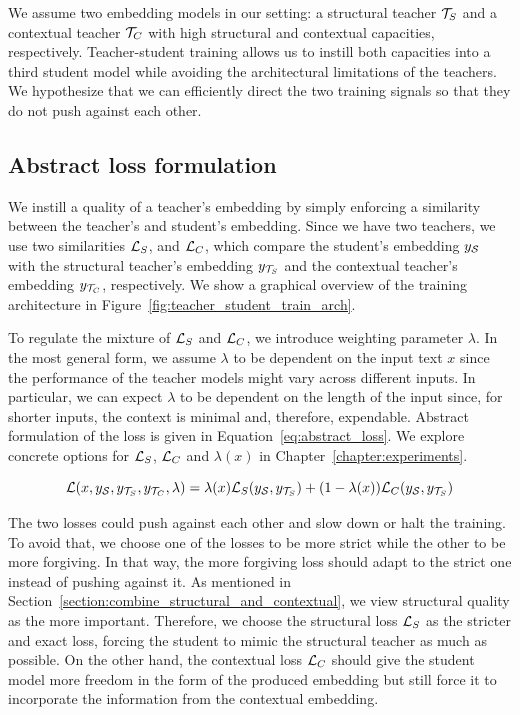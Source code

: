 We assume two embedding models in our setting: a structural teacher
$\mathcal{T}_S$ and a contextual teacher $\mathcal{T}_C$ with high structural and
contextual capacities, respectively. Teacher-student training allows us to
instill both capacities into a third student model {\Student} while avoiding
the architectural limitations of the teachers. We hypothesize that we can
efficiently direct the two training signals so that they do not push against
each other.


\subsection{Abstract loss formulation}\label{section:abstract_loss}


We instill a quality of a teacher's embedding by simply enforcing a similarity
between the teacher's and student's embedding. Since we have two teachers, we
use two similarities $\mathcal{L}_S$, and $\mathcal{L}_C$, which compare the student's
embedding $y_{\mathcal{S}}$ with the structural teacher's embedding $y_{\mathcal{T}_S}$
and the contextual teacher's embedding $y_{\mathcal{T}_C}$, respectively. We show
a graphical overview of the training architecture in
Figure~\ref{fig:teacher_student_train_arch}.

To regulate the mixture of $\mathcal{L}_S$ and $\mathcal{L}_C$, we introduce weighting
parameter $\lambda$. In the most general form, we assume $\lambda$ to be
dependent on the input text $x$ since the performance of the teacher models
might vary across different inputs. In particular, we can expect $\lambda$ to
be dependent on the length of the input since, for shorter inputs, the context
is minimal and, therefore, expendable. Abstract formulation of the loss is
given in Equation~\ref{eq:abstract_loss}. We explore concrete options for
$\mathcal{L}_S$, $\mathcal{L}_C$ and $\lambda(x)$ in Chapter~\ref{chapter:experiments}.

\begin{equation}\label{eq:abstract_loss}
  \mathcal{L}(
    x,
    y_{\mathcal{S}},
    y_{\mathcal{T}_S},
    y_{\mathcal{T}_C},
    \lambda
  ) =
    \lambda(x) \mathcal{L}_S(y_{\mathcal{S}}, y_{\mathcal{T}_S}) +
            (1 - \lambda(x)) \mathcal{L}_C(y_{\mathcal{S}}, y_{\mathcal{T}_S})
\end{equation}

The two losses could push against each other and slow down or halt the
training. To avoid that, we choose one of the losses to be more strict while
the other to be more forgiving. In that way, the more forgiving loss should
adapt to the strict one instead of pushing against it. As mentioned in
Section~\ref{section:combine_structural_and_contextual}, we view structural
quality as the more important. Therefore, we choose the structural loss
$\mathcal{L}_S$ as the stricter and exact loss, forcing the student to mimic the
structural teacher as much as possible. On the other hand, the contextual loss
$\mathcal{L}_C$ should give the student model more freedom in the form of the
produced embedding but still force it to incorporate the information from the
contextual embedding.

